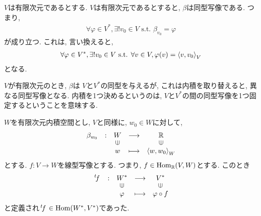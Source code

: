   $V$は有限次元であるとする.
  $V$は有限次元であるとすると,
  $\beta$は同型写像である.
  つまり,
  \begin{align*}
    \forall \varphi \in V^\ast,
    \exists ! v_0 \in V \text{ s.t. }
    \beta_{v_0} = \varphi
  \end{align*}
  が成り立つ.
  これは, 言い換えると,
  \begin{align*}
    \forall \varphi \in V^\ast,
    \exists ! v_0 \in V \text{ s.t. }
    \forall v\in V, \varphi(v)=\Braket{v,v_0}_V
  \end{align*}
  となる.

\begin{remark}
  $V$が有限次元のとき,
  $\beta$は
  $V$と$V^\ast$の同型を与えるが,
  これは内積を取り替えると,
  異なる同型写像となる.
  内積を1つ決めるというのは,
  $V$と$V^\ast$の間の同型写像を1つ固定するということを意味する.
\end{remark}

$W$を有限次元内積空間とし,
$V$と同様に,
$w_0\in W$に対して,
\begin{align*}
  \shazo{\beta_{w_0}}
        {W}{\RR}
        {w}{\Braket{w,w_0}_W}
\end{align*}
とする.
$f\colon V\to W$を線型写像とする.
つまり, $f\in \operatorname{Hom}_{\mathbb{R}}(V,W)$とする.
このとき
\begin{align*}
  \shazo{\transposed{f}}
        {W^\ast}{V^\ast}
        {\varphi}{\varphi\circ f}
\end{align*}
と定義され$\left.^{t}\!f\right.\in \operatorname{Hom}(W^\ast,V^\ast)$であった.

